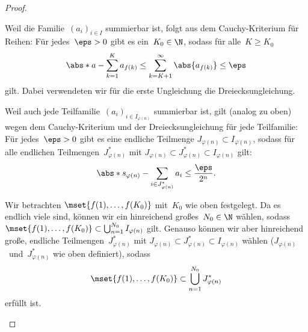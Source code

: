 \documentclass[a4paper]{article}
\begin{document}
\begin{proof}
\begin{enumerate}
              Weil die Familie~$(a_i)_{i\in I}$ summierbar ist, folgt aus dem Cauchy-Kriterium für Reihen: Für jedes~$\eps > 0$ gibt es ein~$K_0 \in \N$, sodass für alle~$K \geq K_0$
              \begin{equation*}
                  \abs*{a - \sum_{k=1}^K a_{f(k)}} \leq \sum_{k=K+1}^\infty \abs{a_{f(k)}} \leq \eps
              \end{equation*}
              gilt. Dabei verwendeten wir für die erste Ungleichung die Dreiecksungleichung.

              Weil auch jede Teilfamilie~$(a_i)_{i\in I_{\varphi(n)}}$ summierbar ist, gilt (analog zu oben) wegen dem Cauchy-Kriterium und der Dreiecksungleichung für jede Teilfamilie: Für jedes~$\eps > 0$ gibt es eine endliche Teilmenge $J_{\varphi(n)} \subset I_{\varphi(n)}$, sodass für alle endlichen Teilmengen~$J^*_{\varphi(n)}$ mit $J_{\varphi(n)} \subset J^*_{\varphi(n)} \subset I_{\varphi(n)}$ gilt:
              \begin{equation*}
                  \abs*{s_{\varphi(n)} - \sum_{i\in J^*_{\varphi(n)}} a_i} \leq \frac{\eps}{2^n}.
              \end{equation*}

              Wir betrachten $\mset{f(1),\dots,f(K_0)}$ mit~$K_0$ wie oben festgelegt. Da es endlich viele sind, können wir ein hinreichend großes~$N_0 \in \N$ wählen, sodass $\mset{f(1),\dots,f(K_0)} \subset \bigcup_{n=1}^{N_0} I_{\varphi(n)}$ gilt. Genauso können wir aber hinreichend große, endliche Teilmengen~$J^*_{\varphi(n)}$ mit $J_{\varphi(n)} \subset J^*_{\varphi(n)} \subset I_{\varphi(n)}$ wählen ($J_{\varphi(n)}$~und~$J^*_{\varphi(n)}$ wie oben definiert), sodass
              \begin{equation}
                  \mset{f(1),\dots,f(K_0)} \subset \bigcup_{n=1}^{N_0} J^*_{\varphi(n)} \label{eqn:bigrearrangement:finite}
              \end{equation}
              erfüllt ist.


\end{enumerate}
\end{proof}
\end{document}
